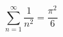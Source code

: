 \documentclass{article}
\begin{document}
\[
  \sum_{n=1}^{\infty} \frac{1}{n^2} = \frac{\pi^2}{6}
\]
\end{document}
